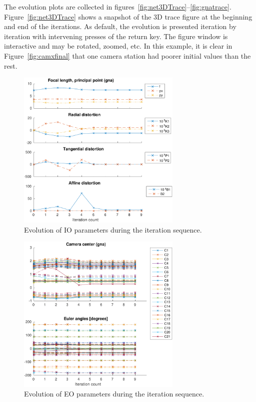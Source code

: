 \documentclass{article}
\begin{document}
The evolution plots are collected in
figures~\ref{fig:net3DTrace}--\ref{fig:gnatrace}.
Figure~\ref{fig:net3DTrace} shows a snapshot of the 3D trace figure at
the beginning and end of the iterations. As default, the evolution is
presented iteration by iteration with intervening presses of the
return key. The figure window is interactive and may be rotated,
zoomed, etc. In this example, it is clear in
Figure~\ref{fig:camxfinal} that one camera station had poorer initial
values than the rest.

\begin{figure}
  \centering
  \includegraphics[width=0.7\textwidth]{ill/ccamiotrace}
  \caption{Evolution of IO parameters during the iteration sequence.}
  \label{fig:IOtrace}
\end{figure}

\begin{figure}
  \centering
  \includegraphics[width=0.7\textwidth]{ill/ccameotrace}
  \caption{Evolution of EO parameters during the iteration sequence.}
  \label{fig:EOtrace}
\end{figure}
\end{document}
